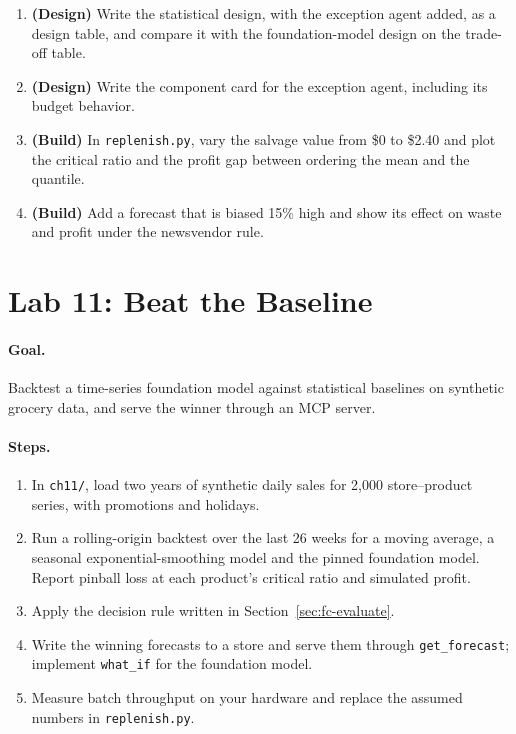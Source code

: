 \begin{enumerate}[itemsep=2pt]
  \item \textbf{(Design)} Write the statistical design, with the exception agent added, as a design table, and compare it with the foundation-model design on the trade-off table.
  \item \textbf{(Design)} Write the component card for the exception agent, including its budget behavior.
  \item \textbf{(Build)} In \texttt{replenish.py}, vary the salvage value from \$0 to \$2.40 and plot the critical ratio and the profit gap between ordering the mean and the quantile.
  \item \textbf{(Build)} Add a forecast that is biased 15\% high and show its effect on waste and profit under the newsvendor rule.
\end{enumerate}

\section*{Lab 11: Beat the Baseline}

\paragraph{Goal.} Backtest a time-series foundation model against statistical baselines on synthetic grocery data, and serve the winner through an MCP server.

\paragraph{Steps.}
\begin{enumerate}[itemsep=2pt]
  \item In \texttt{ch11/}, load two years of synthetic daily sales for 2{,}000 store--product series, with promotions and holidays.
  \item Run a rolling-origin backtest over the last 26 weeks for a moving average, a seasonal exponential-smoothing model and the pinned foundation model. Report pinball loss at each product's critical ratio and simulated profit.
  \item Apply the decision rule written in Section~\ref{sec:fc-evaluate}.
  \item Write the winning forecasts to a store and serve them through \texttt{get\_forecast}; implement \texttt{what\_if} for the foundation model.
  \item Measure batch throughput on your hardware and replace the assumed numbers in \texttt{replenish.py}.
\end{enumerate}

